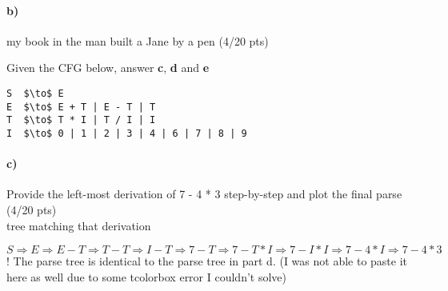 \documentclass[a4paper,12pt]{article}
\begin{document}
\begin{tcolorbox}
\end{tcolorbox}

\paragraph{b)} my book in the man built a Jane by a pen \hfill \small{(4/20 pts)} \\

\begin{tcolorbox}
\end{tcolorbox}

\newpage

Given the CFG below, answer \textbf{c}, \textbf{d} and \textbf{e} \\

\begin{lstlisting}[style=output,mathescape=true]
S  $\to$ E
E  $\to$ E + T | E - T | T
T  $\to$ T * I | T / I | I
I  $\to$ 0 | 1 | 2 | 3 | 4 | 6 | 7 | 8 | 9
\end{lstlisting}

\paragraph{c)} Provide the left-most derivation of 7 - 4 * 3 step-by-step and plot the final parse \hfill \small{(4/20 pts)} \\
tree matching that derivation \\

\begin{tcolorbox}
$S\Rightarrow E\Rightarrow E-T\Rightarrow T-T\Rightarrow I-T\Rightarrow 7-T\Rightarrow 7-T*I\Rightarrow 7-I*I\Rightarrow 7-4*I\Rightarrow 7-4*3$ \\
! The parse tree is identical to the parse tree in part d. (I was not able to paste it here as well due to some tcolorbox error I couldn't solve)
\end{tcolorbox}
\end{document}
